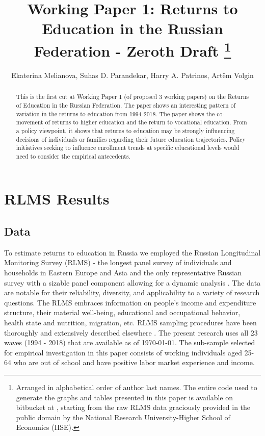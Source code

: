 \documentclass[12pt,a4paper]{article}
\begin{document}
\title{Working Paper 1: Returns to Education in the Russian Federation - Zeroth Draft \footnote{Arranged in alphabetical order of author last names. The entire code used to generate the graphs and tables presented in this paper is available on bitbucket at  , starting from the raw RLMS data graciously provided in the public domain by the National Research University-Higher School of Economics (HSE).}}
\author{Ekaterina Melianova, Suhas D. Parandekar, Harry A. Patrinos, Art\"{e}m Volgin}
\maketitle
\begin{abstract}
This is the first cut at Working Paper 1 (of proposed 3 working papers) on the Returns of Education in the Russian Federation. The paper shows an interesting pattern of variation in the returns to education from 1994-2018. The paper shows the co-movement of returns to higher education and the return to vocational education. From a policy viewpoint, it shows that returns to education may be strongly influencing decisions of individuals or families regarding their future education trajectories. Policy initiatives seeking to influence enrollment trends at specific educational levels would need to consider the empirical antecedents. 
\end{abstract}


\section*{RLMS Results}

\subsection*{Data}

To estimate returns to education in Russia we employed the Russian Longitudinal 
Monitoring Survey (RLMS) - the longest panel survey of individuals and 
households in Eastern Europe and Asia and the only representative Russian 
survey with a sizable panel component allowing for a dynamic analysis 
\parencite{kozyreva_081._2015}. The data are notable for their reliability, 
diversity, and applicability to a variety of research questions. The RLMS 
embraces information on people's income and expenditure structure, their 
material well-being, educational and occupational behavior, health state and 
nutrition, migration, etc.  RLMS sampling procedures have been thoroughly and 
extensively described elsewhere \parencite{kozyreva_081._2015}. The present 
research uses all 23 waves (1994 - 2018) that are available as of \today. The 
sub-sample selected for empirical investigation  in this paper consists of 
working individuals aged 25-64 who are out of school and have positive labor 
market experience and income.
\\
\end{document}
